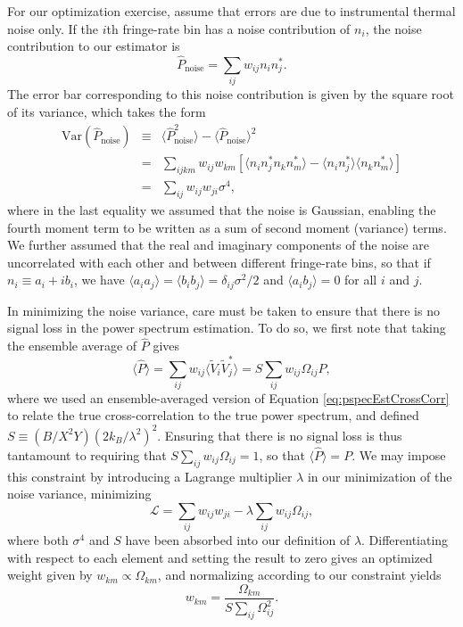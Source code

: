 \documentclass[twocolumn,apj,numberedappendix]{emulateapj}
\begin{document}
For our optimization exercise, assume that errors are due to instrumental thermal noise only. If the $i$th fringe-rate bin has a noise contribution of $n_i$, the noise contribution to our estimator is
\begin{equation}
\widehat{P}_\textrm{noise} = \sum_{ij} w_{ij} n_i n_j^*.
\end{equation}
The error bar corresponding to this noise contribution is given by the square root of its variance, which takes the form
\begin{eqnarray}
\label{eq:NoiseVar}
\textrm{Var}(\widehat{P}_\textrm{noise} ) &\equiv& \langle \widehat{P}_\textrm{noise}^2 \rangle - \langle \widehat{P}_\textrm{noise} \rangle^2 \nonumber \\
&= & \sum_{ijkm} w_{ij} w_{km} \left[ \langle n_i n_j^* n_k n_m^* \rangle - \langle n_i n_j^*\rangle \langle n_k n_m^* \rangle \right] \nonumber \\
&=&  \sum_{ij} w_{ij} w_{ji}\sigma^4,
\end{eqnarray}
where in the last equality we assumed that the noise is Gaussian, enabling the fourth moment term to be written as a sum of second moment (variance) terms. We further assumed that the real and imaginary components of the noise are uncorrelated with each other and between different fringe-rate bins, so that if $n_i \equiv a_i + i b_i$, we have $\langle a_i a_j \rangle = \langle b_i b_j \rangle = \delta_{ij} \sigma^2/2 $ and $\langle a_i b_j \rangle= 0$ for all $i$ and $j$.

In minimizing the noise variance, care must be taken to ensure that there is no signal loss in the power spectrum estimation. To do so, we first note that taking the ensemble average of $\widehat{P}$ gives
\begin{equation}
\langle \widehat{P} \rangle = \sum_{ij} w_{ij} \langle \widetilde{V}_i \widetilde{V}_j^* \rangle = S \sum_{ij} w_{ij} \Omega_{ij} P,
\end{equation}
where we used an ensemble-averaged version of Equation \eqref{eq:pspecEstCrossCorr} to relate the true cross-correlation to the true power spectrum, and defined $S \equiv ( B / X^2 Y) ( 2 k_B / \lambda^2 )^2$. Ensuring that there is no signal loss is thus tantamount to requiring that $ S \sum_{ij} w_{ij} \Omega_{ij} =1$, so that $\langle \widehat{P} \rangle = P$. We may impose this constraint by introducing a Lagrange multiplier $\lambda$ in our minimization of the noise variance, minimizing
\begin{equation}
\mathcal L = \sum_{ij} w_{ij} w_{ji} - \lambda \sum_{ij} w_{ij} \Omega_{ij},
\end{equation}
where both $\sigma^4$ and $S$ have been absorbed into our definition of $\lambda$. Differentiating with respect to each element and setting the result to zero gives an optimized weight given by $w_{km} \propto \Omega_{km}$, and normalizing according to our constraint yields
\begin{equation}
\label{eq:PspecOptWeights}
w_{km} = \frac{\Omega_{km}}{S \sum_{ij} \Omega_{ij}^2}.
\end{equation}
\end{document}
